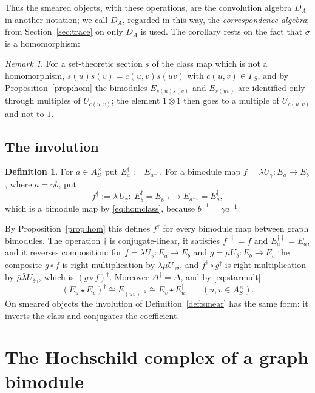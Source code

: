 \documentclass[11pt]{amsart}
\theoremstyle{definition}
\newtheorem{definition}[theorem]{Definition}
\theoremstyle{remark}
\newtheorem{remark}[theorem]{Remark}
\newcommand{\DA}{D_A}
\begin{document}
Thus the smeared objects, with these operations, are the convolution algebra
$\DA$ in another notation; we call $\DA$, regarded in this way, the
\emph{correspondence algebra}; from Section~\ref{sec:trace} on only $\DA$ is
used.  The corollary rests on the fact that $\sigma$ is a homomorphism:

\begin{remark}\label{rem:types}
For a set-theoretic section $s$ of the class map which is not a homomorphism,
$s(u)s(v)=c(u,v)s(uv)$ with $c(u,v)\in\Gamma_S$, and by
Proposition~\ref{prop:hom} the bimodules $E_{s(u)s(v)}$ and $E_{s(uv)}$ are
identified only through multiples of $U_{c(u,v)}$; the element $1\otimes1$
then goes to a multiple of $U_{c(u,v)}$ and not to $1$.
\end{remark}

\subsection{The involution}\label{sec:dagger}

\begin{definition}\label{def:dagger}
For $a\in A_S^{\times}$ put $E_a^{\dagger}:=E_{a^{-1}}$.  For a bimodule map
$f=\lambda U_{\gamma}:E_a\to E_b$, where $a=\gamma b$, put
\[
f^{\dagger}:=\bar\lambda\,U_{\gamma}:\ E_b^{\dagger}=E_{b^{-1}}\longrightarrow
E_{a^{-1}}=E_a^{\dagger},
\]
which is a bimodule map by \eqref{eq:homclass}, because
$b^{-1}=\gamma a^{-1}$.
\end{definition}

By Proposition~\ref{prop:hom} this defines $f^{\dagger}$ for every bimodule
map between graph bimodules.  The operation $\dagger$ is conjugate-linear, it
satisfies $f^{\dagger\dagger}=f$ and $E_a^{\dagger\dagger}=E_a$, and it
reverses composition: for $f=\lambda U_{\gamma}:E_a\to E_b$ and
$g=\mu U_{\delta}:E_b\to E_c$ the composite $g\circ f$ is right multiplication
by $\lambda\mu U_{\gamma\delta}$, and
$f^{\dagger}\circ g^{\dagger}$ is right multiplication by
$\bar\mu\bar\lambda U_{\delta\gamma}$, which is $(g\circ f)^{\dagger}$.
Moreover $\Delta^{\dagger}=\Delta$, and by \eqref{eq:starmult}
\[
(E_u\star E_v)^{\dagger}\cong E_{(uv)^{-1}}\cong E_v^{\dagger}\star E_u^{\dagger}
\qquad(u,v\in A_S^{\times}).
\]
On smeared objects the involution of Definition~\ref{def:smear} has the same
form: it inverts the class and conjugates the coefficient.

\section{The Hochschild complex of a graph bimodule}\label{sec:shadow}
\end{document}
